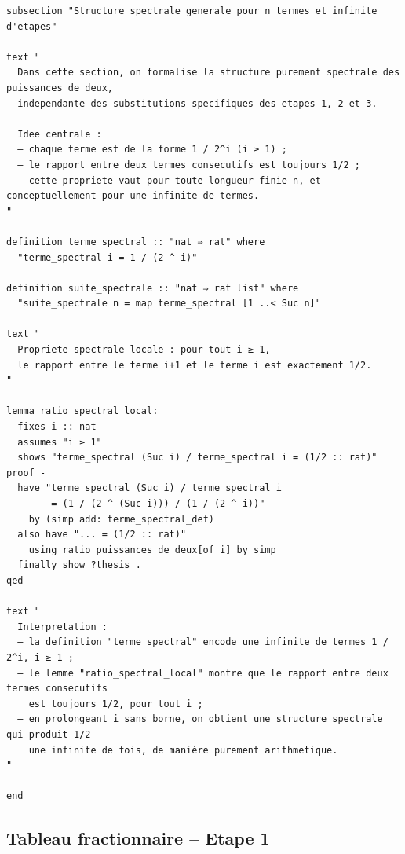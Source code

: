 \documentclass[a4paper,11pt]{article}
\begin{document}
\begin{holcode}[title={\textcolor{white}{Fichier : methode\_de\_philippot.thy -- COMPLET}}]
\begin{lstlisting}
subsection "Structure spectrale generale pour n termes et infinite d'etapes"

text "
  Dans cette section, on formalise la structure purement spectrale des puissances de deux,
  independante des substitutions specifiques des etapes 1, 2 et 3.

  Idee centrale :
  – chaque terme est de la forme 1 / 2^i (i ≥ 1) ;
  – le rapport entre deux termes consecutifs est toujours 1/2 ;
  – cette propriete vaut pour toute longueur finie n, et conceptuellement pour une infinite de termes.
"

definition terme_spectral :: "nat ⇒ rat" where
  "terme_spectral i = 1 / (2 ^ i)"

definition suite_spectrale :: "nat ⇒ rat list" where
  "suite_spectrale n = map terme_spectral [1 ..< Suc n]"

text "
  Propriete spectrale locale : pour tout i ≥ 1,
  le rapport entre le terme i+1 et le terme i est exactement 1/2.
"

lemma ratio_spectral_local:
  fixes i :: nat
  assumes "i ≥ 1"
  shows "terme_spectral (Suc i) / terme_spectral i = (1/2 :: rat)"
proof -
  have "terme_spectral (Suc i) / terme_spectral i
        = (1 / (2 ^ (Suc i))) / (1 / (2 ^ i))"
    by (simp add: terme_spectral_def)
  also have "... = (1/2 :: rat)"
    using ratio_puissances_de_deux[of i] by simp
  finally show ?thesis .
qed

text "
  Interpretation :
  – la definition "terme_spectral" encode une infinite de termes 1 / 2^i, i ≥ 1 ;
  – le lemme "ratio_spectral_local" montre que le rapport entre deux termes consecutifs
    est toujours 1/2, pour tout i ;
  – en prolongeant i sans borne, on obtient une structure spectrale qui produit 1/2
    une infinite de fois, de manière purement arithmetique.
"

end

\end{lstlisting}
\end{holcode}

\subsection{Tableau fractionnaire -- Etape 1}
\end{document}

